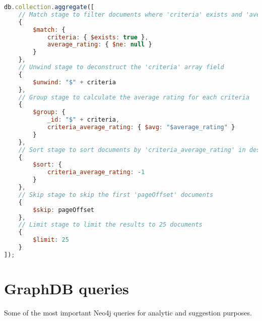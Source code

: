\begin{lstlisting}[language=JavaScript]
db.collection.aggregate([
    // Match stage to filter documents where 'criteria' exists and 'average_rating' is not null
    {
        $match: {
            criteria: { $exists: true },
            average_rating: { $ne: null }
        }
    },
    // Unwind stage to deconstruct the 'criteria' array field
    {
        $unwind: "$" + criteria
    },
    // Group stage to calculate the average rating for each criteria
    {
        $group: {
            _id: "$" + criteria,
            criteria_average_rating: { $avg: "$average_rating" }
        }
    },
    // Sort stage to sort documents by 'criteria_average_rating' in descending order
    {
        $sort: {
            criteria_average_rating: -1
        }
    },
    // Skip stage to skip the first 'pageOffset' documents
    {
        $skip: pageOffset
    },
    // Limit stage to limit the results to 25 documents
    {
        $limit: 25
    }
]);
\end{lstlisting}




\newpage


  
\section{GraphDB queries}
Some of the most important Neo4j queries for analytic and suggestion purposes.

